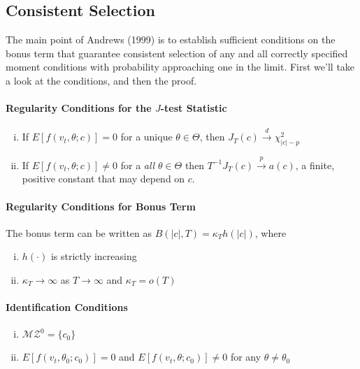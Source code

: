 \subsection{Consistent Selection}
The main point of Andrews (1999) is to establish sufficient conditions on the bonus term that guarantee consistent selection of any and all correctly specified moment conditions with probability approaching one in the limit. First we'll take a look at the conditions, and then the proof.

\paragraph{Regularity Conditions for the $J$-test Statistic}
	\begin{enumerate}[(i)]
		\item If $E[f(v_t, \theta;c)] =0$ for a unique $\theta \in \Theta$, then $J_T(c) \overset{d}{\rightarrow} \chi^2_{|c| -p}$
		\item If $E[f(v_t, \theta;c)] \neq 0$ for a \emph{all} $\theta \in \Theta$ then $T^{-1} J_T(c) \overset{p}{\rightarrow} a(c)$, a finite, positive constant that may depend on $c$.
	\end{enumerate}


\paragraph{Regularity Conditions for Bonus Term} The bonus term can be written as $B(|c|,T) = \kappa_T h(|c|)$, where
	\begin{enumerate}[(i)]
		\item $h(\cdot)$ is strictly increasing
		\item $\kappa_T \rightarrow \infty$ as $T\rightarrow \infty$ and $\kappa_T =o(T)$
	\end{enumerate}

\paragraph{Identification Conditions}
	\begin{enumerate}[(i)]
		\item $\mathcal{MZ}^0 = \{c_0\}$
		\item $E[f(v_t, \theta_0; c_0)] = 0$ and $E[f(v_t, \theta; c_0)]\neq 0$ for any $\theta \neq \theta_0$
	\end{enumerate}


